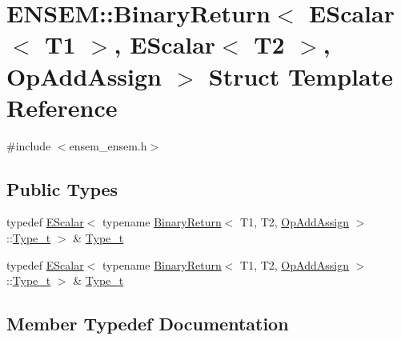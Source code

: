\hypertarget{structENSEM_1_1BinaryReturn_3_01EScalar_3_01T1_01_4_00_01EScalar_3_01T2_01_4_00_01OpAddAssign_01_4}{}\section{E\+N\+S\+EM\+:\+:Binary\+Return$<$ E\+Scalar$<$ T1 $>$, E\+Scalar$<$ T2 $>$, Op\+Add\+Assign $>$ Struct Template Reference}
\label{structENSEM_1_1BinaryReturn_3_01EScalar_3_01T1_01_4_00_01EScalar_3_01T2_01_4_00_01OpAddAssign_01_4}


{\ttfamily \#include $<$ensem\+\_\+ensem.\+h$>$}

\subsection*{Public Types}
\begin{DoxyCompactItemize}
\item 
typedef \mbox{\hyperlink{classENSEM_1_1EScalar}{E\+Scalar}}$<$ typename \mbox{\hyperlink{structENSEM_1_1BinaryReturn}{Binary\+Return}}$<$ T1, T2, \mbox{\hyperlink{structENSEM_1_1OpAddAssign}{Op\+Add\+Assign}} $>$\+::\mbox{\hyperlink{structENSEM_1_1BinaryReturn_3_01EScalar_3_01T1_01_4_00_01EScalar_3_01T2_01_4_00_01OpAddAssign_01_4_ad164ca2eb4612dd3d345ede329e0a944}{Type\+\_\+t}} $>$ \& \mbox{\hyperlink{structENSEM_1_1BinaryReturn_3_01EScalar_3_01T1_01_4_00_01EScalar_3_01T2_01_4_00_01OpAddAssign_01_4_ad164ca2eb4612dd3d345ede329e0a944}{Type\+\_\+t}}
\item 
typedef \mbox{\hyperlink{classENSEM_1_1EScalar}{E\+Scalar}}$<$ typename \mbox{\hyperlink{structENSEM_1_1BinaryReturn}{Binary\+Return}}$<$ T1, T2, \mbox{\hyperlink{structENSEM_1_1OpAddAssign}{Op\+Add\+Assign}} $>$\+::\mbox{\hyperlink{structENSEM_1_1BinaryReturn_3_01EScalar_3_01T1_01_4_00_01EScalar_3_01T2_01_4_00_01OpAddAssign_01_4_ad164ca2eb4612dd3d345ede329e0a944}{Type\+\_\+t}} $>$ \& \mbox{\hyperlink{structENSEM_1_1BinaryReturn_3_01EScalar_3_01T1_01_4_00_01EScalar_3_01T2_01_4_00_01OpAddAssign_01_4_ad164ca2eb4612dd3d345ede329e0a944}{Type\+\_\+t}}
\end{DoxyCompactItemize}


\subsection{Member Typedef Documentation}
\mbox{\label{structENSEM_1_1BinaryReturn_3_01EScalar_3_01T1_01_4_00_01EScalar_3_01T2_01_4_00_01OpAddAssign_01_4_ad164ca2eb4612dd3d345ede329e0a944}} 
